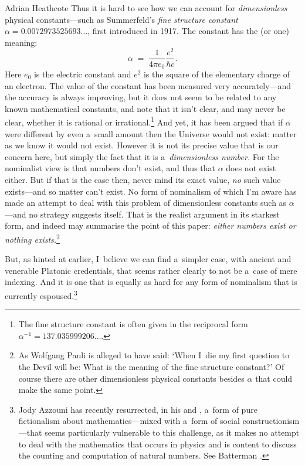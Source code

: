 \begin{artengenv}{Adrian Heathcote}
Thus it is hard to see how we can account for \textit{dimensionless} physical constants---such as Summerfeld's \textit{fine structure constant} $\alpha = 0.0072973525693\ldots$, first introduced in 1917. The constant has the (or one) meaning:
\[ \alpha\; =\; \frac{1}{4 \pi e_{0}} \frac{e^{2}}{\hbar c}.  \]
Here $e_{0}$ is the electric constant and $e^{2}$ is the square of the elementary charge of an electron. The value of the constant has been measured very accurately---and the accuracy is always improving, but it does not seem to be related to any known mathematical constants, and note that it isn't clear, and may never be clear, whether it is rational or irrational.\footnote{The fine structure constant is often given in the reciprocal form $\alpha^{-1} = 137.035999206\ldots$.} And yet, it has been argued that if $\alpha$ were different by even a~small amount then the Universe would not exist: matter as we know it would not exist. However it is not its precise value that is our concern here, but simply the fact that it is a~\textit{dimensionless number.} For the nominalist view is that numbers don't exist, and thus that $\alpha$ does not exist either. But if that is the case then, never mind its exact value, \textit{no} such value exists---and so matter can't exist. No form of nominalism of which I'm aware has made an attempt to deal with this problem of dimensionless constants such as $\alpha$---and no strategy suggests itself. That is the realist argument in its starkest form, and indeed may summarise the point of this paper: \textit{either numbers exist or nothing exists.}\footnote{As Wolfgang Pauli is alleged to have said: `When I~die my first question to the Devil will be: What is the meaning of the fine structure constant?' Of course there are other dimensionless physical constants besides $\alpha$ that could make the same point.}


But, as hinted at earlier, I~believe we can find a~simpler case, with ancient and venerable Platonic credentials, that seems rather clearly to not be a~case of mere indexing. And it is one that is equally as hard for any form of nominalism that is currently espoused.\footnote{Jody Azzouni has recently resurrected, in his \parencite*{azzouni_deflating_2006} and \parencite*{azzouni_talking_2010}, a~form of pure fictionalism about mathematics---mixed with a~form of social constructionism---that seems particularly vulnerable to this challenge, as it makes no attempt to deal with the mathematics that occurs in physics and is content to discuss the counting and computation of natural numbers. See Batterman \parencite*{batterman_explanatory_2010}.}


\end{artengenv}
